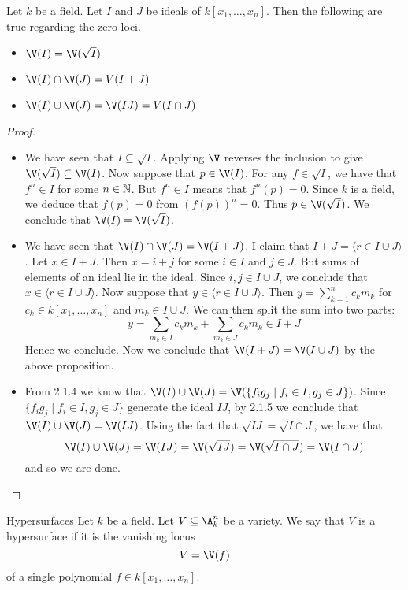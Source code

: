 \documentclass[a4paper]{article}
\begin{document}
\begin{prp}{}{} Let $k$ be a field. Let $I$ and $J$ be ideals of $k[x_1,\dots,x_n]$. Then the following are true regarding the zero loci. 
\begin{itemize}
\item $\V(I)=\V(\sqrt{I})$
\item $\V(I)\cap\V(J)=V(I+J)$
\item $\V(I)\cup\V(J)=\V(IJ)=V(I\cap J)$
\end{itemize}
\begin{proof}~\\
\begin{itemize}
\item We have seen that $I\subseteq\sqrt{I}$. Applying $\V$ reverses the inclusion to give $\V(\sqrt{I})\subseteq\V(I)$. Now suppose that $p\in\V(I)$. For any $f\in\sqrt{I}$, we have that $f^n\in I$ for some $n\in\mathbb{N}$. But $f^n\in I$ means that $f^n(p)=0$. Since $k$ is a field, we deduce that $f(p)=0$ from $(f(p))^n=0$. Thus $p\in\V(\sqrt{I})$. We conclude that $\V(I)=\V(\sqrt{I})$. 
\item We have seen that $\V(I)\cap\V(J)=\V(I+J)$. I claim that $I+J=\langle r\in I\cup J\rangle$. Let $x\in I+J$. Then $x=i+j$ for some $i\in I$ and $j\in J$. But sums of elements of an ideal lie in the ideal. Since $i,j\in I\cup J$, we conclude that $x\in\langle r\in I\cup J\rangle$. Now suppose that $y\in\langle r\in I\cup J\rangle$. Then $y=\sum_{k=1}^nc_km_k$ for $c_k\in k[x_1,\dots,x_n]$ and $m_k\in I\cup J$. We can then split the sum into two parts: $$y=\sum_{m_k\in I}c_km_k+\sum_{m_k\in J}c_km_k\in I+J$$ Hence we conclude. Now we conclude that $\V(I+J)=\V(I\cup J)$ by the above proposition. 
\item From 2.1.4 we know that $\V(I)\cup\V(J)=\V(\{f_ig_j\;|\;f_i\in I, g_j\in J\})$. Since $\{f_ig_j\;|\;f_i\in I,g_j\in J\}$ generate the ideal $IJ$, by 2.1.5 we conclude that $\V(I)\cup\V(J)=\V(IJ)$. Using the fact that $\sqrt{IJ}=\sqrt{I\cap J}$, we have that $$\V(I)\cup\V(J)=\V(IJ)=\V(\sqrt{IJ})=\V(\sqrt{I\cap J})=\V(I\cap J)$$ and so we are done. 
\end{itemize}
\end{proof}
\end{prp}

\begin{defn}{Hypersurfaces}{} Let $k$ be a field. Let $V\subseteq\A_k^n$ be a variety. We say that $V$ is a hypersurface if it is the vanishing locus $$V=\V(f)$$ of a single polynomial $f\in k[x_1,\dots,x_n]$. 
\end{defn}
\end{document}
